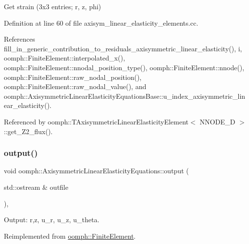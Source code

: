 Get strain (3x3 entries; r, z, phi) 



Definition at line 60 of file axisym\+\_\+linear\+\_\+elasticity\+\_\+elements.\+cc.



References fill\+\_\+in\+\_\+generic\+\_\+contribution\+\_\+to\+\_\+residuals\+\_\+axisymmetric\+\_\+linear\+\_\+elasticity(), i, oomph\+::\+Finite\+Element\+::interpolated\+\_\+x(), oomph\+::\+Finite\+Element\+::nnodal\+\_\+position\+\_\+type(), oomph\+::\+Finite\+Element\+::nnode(), oomph\+::\+Finite\+Element\+::raw\+\_\+nodal\+\_\+position(), oomph\+::\+Finite\+Element\+::raw\+\_\+nodal\+\_\+value(), and oomph\+::\+Axisymmetric\+Linear\+Elasticity\+Equations\+Base\+::u\+\_\+index\+\_\+axisymmetric\+\_\+linear\+\_\+elasticity().



Referenced by oomph\+::\+T\+Axisymmetric\+Linear\+Elasticity\+Element$<$ N\+N\+O\+D\+E\+\_\+D $>$\+::get\+\_\+\+Z2\+\_\+flux().

\mbox{\label{classoomph_1_1AxisymmetricLinearElasticityEquations_a798627057a8d79bccc17d277e1717f67}} 
\subsubsection{\texorpdfstring{output()}{output()}\hspace{0.1cm}{\footnotesize\ttfamily [1/4]}}
{\footnotesize\ttfamily void oomph\+::\+Axisymmetric\+Linear\+Elasticity\+Equations\+::output (\begin{DoxyParamCaption}\item[{std\+::ostream \&}]{outfile }\end{DoxyParamCaption})\hspace{0.3cm}{\ttfamily [inline]}, {\ttfamily [virtual]}}



Output\+: r,z, u\+\_\+r, u\+\_\+z, u\+\_\+theta. 



Reimplemented from \hyperlink{classoomph_1_1FiniteElement_a2ad98a3d2ef4999f1bef62c0ff13f2a7}{oomph\+::\+Finite\+Element}.



